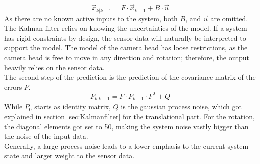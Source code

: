 \begin{equation*}
    \vec{x}_{k|k-1} = 
    F
    \cdot
    \vec{x}_{k-1}
    +
    B
    \cdot
    \vec{u}
\end{equation*}
As there are no known active inputs to the system, both $B$, and $\vec{u}$ are omitted.\\
The Kalman filter relies on knowing the uncertainties of the model. If a system has rigid constraints by design, the sensor data will naturally be interpreted to support the model. The model of the camera head has loose restrictions, as the camera head is free to move in any direction and rotation; therefore, the output heavily relies on the sensor data.\\
The second step of the prediction is the prediction of the covariance matrix of the errors $P$. 
\begin{equation*}
    P_{k|k-1} = 
    F
    \cdot
    P_{k-1}
    \cdot
    F^{T}
    +
    Q
\end{equation*}
While $P_{0}$ starts as identity matrix, $Q$ is the gaussian process noise, which got explained in section \ref{sec:Kalmanfilter} for the translational part. For the rotation, the diagonal elements got set to 50, making the system noise vastly bigger than the noise of the input data.\\
Generally, a large process noise leads to a lower emphasis to the current system state and larger weight to the sensor data.\\ 
